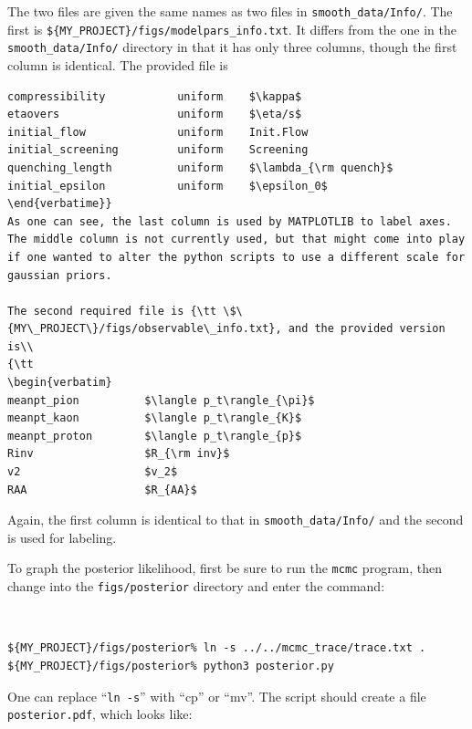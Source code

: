 \documentclass[UserManual.tex]{subfiles}
\begin{document}
The two files are given the same names as two files in {\tt smooth\_data/Info/}. The first is {\tt \$\{MY\_PROJECT\}/figs/modelpars\_info.txt}. It differs from the one in the {\tt smooth\_data/Info/} directory in that it has only three columns, though the first column is identical. The provided file is\\
{\tt\begin{verbatim}
compressibility           uniform    $\kappa$
etaovers                  uniform    $\eta/s$
initial_flow              uniform    Init.Flow
initial_screening         uniform    Screening
quenching_length          uniform    $\lambda_{\rm quench}$
initial_epsilon           uniform    $\epsilon_0$
\end{verbatime}}
As one can see, the last column is used by MATPLOTLIB to label axes. The middle column is not currently used, but that might come into play if one wanted to alter the python scripts to use a different scale for gaussian priors.

The second required file is {\tt \$\{MY\_PROJECT\}/figs/observable\_info.txt}, and the provided version is\\
{\tt
\begin{verbatim}
meanpt_pion          $\langle p_t\rangle_{\pi}$
meanpt_kaon          $\langle p_t\rangle_{K}$
meanpt_proton        $\langle p_t\rangle_{p}$
Rinv                 $R_{\rm inv}$
v2                   $v_2$
RAA                  $R_{AA}$
\end{verbatim}}
Again, the first column is identical to that in {\tt smooth\_data/Info/} and the second is used for labeling.

To graph the posterior likelihood, first be sure to run the {\tt mcmc} program, then change into the {\tt figs/posterior} directory and enter the command:
{\tt
\begin{verbatim}
${MY_PROJECT}/figs/posterior% ln -s ../../mcmc_trace/trace.txt .
${MY_PROJECT}/figs/posterior% python3 posterior.py
\end{verbatim}}
One can replace ``{\tt ln -s}'' with ``cp'' or ``mv''. The script should create a file {\tt posterior.pdf}, which looks like:
\end{document}
